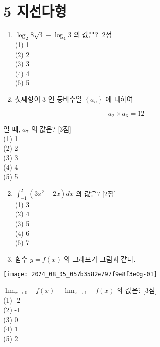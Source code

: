 \documentclass[10pt]{article}
\begin{document}
\section*{5 지선다형}
\begin{enumerate}
  \item \(\log _{2} 8 \sqrt{3}-\log _{4} 3\) 의 값은? [2점]\\
(1) 1\\
(2) 2\\
(3) 3\\
(4) 4\\
(5) 5

  \item 첫째항이 3 인 등비수열 \(\left\{a_{n}\right\}\) 에 대하여

\end{enumerate}

\[
a_{2} \times a_{6}=12
\]

일 때, \(a_{7}\) 의 값은? [3점]\\
(1) 1\\
(2) 2\\
(3) 3\\
(4) 4\\
(5) 5

\begin{enumerate}
  \setcounter{enumi}{1}
  \item \(\int_{-1}^{2}\left(3 x^{2}-2 x\right) d x\) 의 값은? [2점]\\
(1) 3\\
(2) 4\\
(3) 5\\
(4) 6\\
(5) 7

  \item 함수 \(y=f(x)\) 의 그래프가 그림과 같다.

\end{enumerate}

\begin{center}
\texttt{[image: 2024\_08\_05\_057b3582e797f9e8f3e0g-01]}
\end{center}

\(\lim _{x \rightarrow 0-} f(x)+\lim _{x \rightarrow 1+} f(x)\) 의 값은? [3점]\\
(1) -2\\
(2) -1\\
(3) 0\\
(4) 1\\
(5) 2
\end{document}
